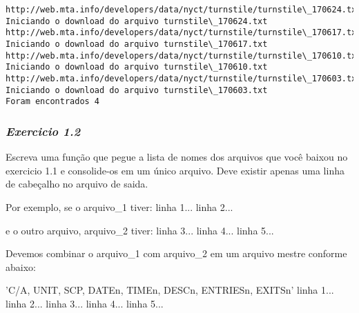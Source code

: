 \documentclass[11pt]{article}
\begin{document}
    \begin{Verbatim}[commandchars=\\\{\}]
http://web.mta.info/developers/data/nyct/turnstile/turnstile\_170624.txt
Iniciando o download do arquivo turnstile\_170624.txt
http://web.mta.info/developers/data/nyct/turnstile/turnstile\_170617.txt
Iniciando o download do arquivo turnstile\_170617.txt
http://web.mta.info/developers/data/nyct/turnstile/turnstile\_170610.txt
Iniciando o download do arquivo turnstile\_170610.txt
http://web.mta.info/developers/data/nyct/turnstile/turnstile\_170603.txt
Iniciando o download do arquivo turnstile\_170603.txt
Foram encontrados 4

    \end{Verbatim}

    \subsubsection{\texorpdfstring{\emph{Exercicio
1.2}}{Exercicio 1.2}}\label{exercicio-1.2}

Escreva uma função que pegue a lista de nomes dos arquivos que você
baixou no exercicio 1.1 e consolide-os em um único arquivo. Deve existir
apenas uma linha de cabeçalho no arquivo de saida.

Por exemplo, se o arquivo\_1 tiver: linha 1... linha 2...

e o outro arquivo, arquivo\_2 tiver: linha 3... linha 4... linha 5...

Devemos combinar o arquivo\_1 com arquivo\_2 em um arquivo mestre
conforme abaixo:

'C/A, UNIT, SCP, DATEn, TIMEn, DESCn, ENTRIESn, EXITSn' linha 1... linha
2... linha 3... linha 4... linha 5...
\end{document}
